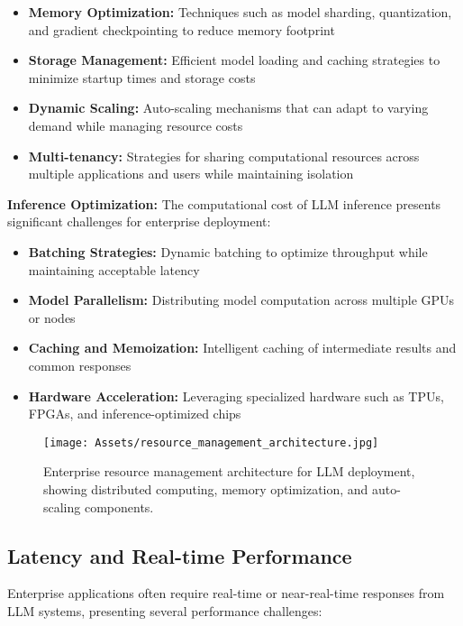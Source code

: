 \begin{itemize}
    \item \textbf{Memory Optimization:} Techniques such as model sharding, quantization, and gradient checkpointing to reduce memory footprint
    \item \textbf{Storage Management:} Efficient model loading and caching strategies to minimize startup times and storage costs
    \item \textbf{Dynamic Scaling:} Auto-scaling mechanisms that can adapt to varying demand while managing resource costs
    \item \textbf{Multi-tenancy:} Strategies for sharing computational resources across multiple applications and users while maintaining isolation
\end{itemize}

\textbf{Inference Optimization:}
The computational cost of LLM inference presents significant challenges for enterprise deployment:

\begin{itemize}
    \item \textbf{Batching Strategies:} Dynamic batching to optimize throughput while maintaining acceptable latency
    \item \textbf{Model Parallelism:} Distributing model computation across multiple GPUs or nodes
    \item \textbf{Caching and Memoization:} Intelligent caching of intermediate results and common responses
    \item \textbf{Hardware Acceleration:} Leveraging specialized hardware such as TPUs, FPGAs, and inference-optimized chips
\end{itemize}

\begin{figure}[H]
    \centering
    \texttt{[image: Assets/resource\_management\_architecture.jpg]}
    \caption{Enterprise resource management architecture for LLM deployment, showing distributed computing, memory optimization, and auto-scaling components.\cite{AnatomyOfTgi}}
    \label{fig:resource_management_architecture}
\end{figure}

\subsection{Latency and Real-time Performance}

Enterprise applications often require real-time or near-real-time responses from LLM systems, presenting several performance challenges:

